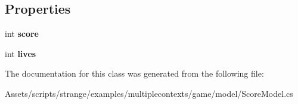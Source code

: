 \subsection*{Properties}
\begin{DoxyCompactItemize}
\item 
\hypertarget{classstrange_1_1examples_1_1multiplecontexts_1_1game_1_1_score_model_aacc295cf510cf7da78110c64a81128dc}{int {\bfseries score}}\label{classstrange_1_1examples_1_1multiplecontexts_1_1game_1_1_score_model_aacc295cf510cf7da78110c64a81128dc}

\item 
\hypertarget{classstrange_1_1examples_1_1multiplecontexts_1_1game_1_1_score_model_a728f356ac3fab6b5bed552ff087c09d8}{int {\bfseries lives}}\label{classstrange_1_1examples_1_1multiplecontexts_1_1game_1_1_score_model_a728f356ac3fab6b5bed552ff087c09d8}

\end{DoxyCompactItemize}


The documentation for this class was generated from the following file\-:\begin{DoxyCompactItemize}
\item 
Assets/scripts/strange/examples/multiplecontexts/game/model/Score\-Model.\-cs\end{DoxyCompactItemize}
